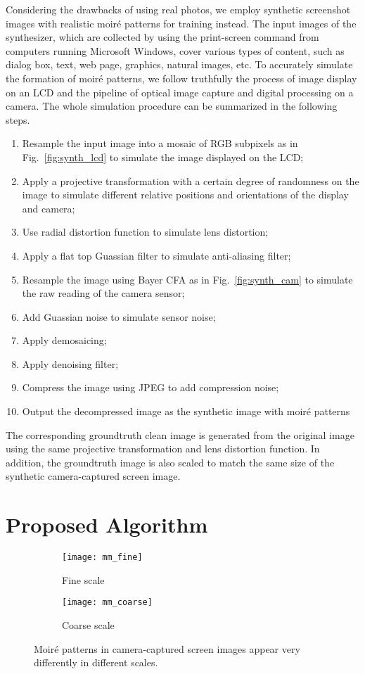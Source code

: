 \documentclass[10pt,twocolumn,letterpaper]{article}
\begin{document}
Considering the drawbacks of using real photos, we employ synthetic
screenshot images with realistic moir\'e patterns for training
instead.  The input images of the synthesizer, which are collected by
using the print-screen command from computers running Microsoft
Windows, cover various types of content, such as dialog box, text, web
page, graphics, natural images, etc.  To accurately simulate the
formation of moir\'e patterns, we follow truthfully the process of
image display on an LCD and the pipeline of optical image capture and
digital processing on a camera.  The whole simulation procedure can be
summarized in the following steps.
\begin{enumerate}
\item Resample the input image into a mosaic of RGB subpixels as in
  Fig.~\ref{fig:synth_lcd} to simulate the image displayed on the LCD;
\item Apply a projective transformation with a certain degree of
  randomness on the image to simulate different relative positions and
  orientations of the display and camera;
\item Use radial distortion function to simulate lens distortion;
\item Apply a flat top Guassian filter to simulate anti-aliasing
  filter;
\item Resample the image using Bayer CFA as in
  Fig.~\ref{fig:synth_cam} to simulate the raw reading of the camera
  sensor;
\item Add Guassian noise to simulate sensor noise;
\item Apply demosaicing;
\item Apply denoising filter;
\item Compress the image using JPEG to add compression noise;
\item Output the decompressed image as the synthetic image with
  moir\'e patterns
\end{enumerate}
The corresponding groundtruth clean image is generated from the
original image using the same projective transformation and lens
distortion function.  In addition, the groundtruth image is also
scaled to match the same size of the synthetic camera-captured screen
image.

\section{Proposed Algorithm}
\label{sec:algorithm}

\begin{figure}
  \centering
  \begin{subfigure}[t]{0.45\linewidth}
    \centering
    \texttt{[image: mm\_fine]}
    \caption{Fine scale}
  \end{subfigure}
  \begin{subfigure}[t]{0.45\linewidth}
    \centering
    \texttt{[image: mm\_coarse]}
    \caption{Coarse scale}
  \end{subfigure}
  \caption{Moir\'e patterns in camera-captured screen images appear
    very differently in different scales.}
  \label{fig:moire}
\end{figure}
\end{document}
